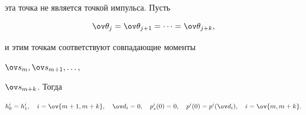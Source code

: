 эта точка не является точкой импульса. Пусть


$$


\ov\theta_j=\ov\theta_{j+1}=\dotsb=\ov\theta_{j+k},


$$


и этим точкам соответствуют совпадающие моменты


$\ov s_m, \ov s_{m+1}, \dotsc,$


$\ov s_{m+k}$. Тогда


$$


h_0^{i}=h_1^{i},\quad i=\ov{m+1,m+k}, \quad \ov


d_i=0, \quad p_s^i(0)=0,\quad p^i(0)=p^i(\ov d_i), \quad


i=\ov{m,m+k}.


$$








